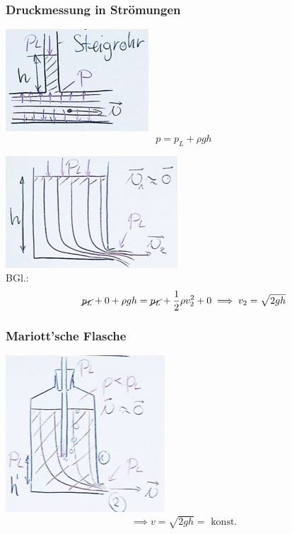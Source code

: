 \subsubsection{Druckmessung in Strömungen}
\includegraphics{Bild85}
\[ p = p_L + \rho g h \]
\begin{bsp*}[ note = Infusion ]
	\includegraphics{Bild86} \\
	BGl.:
	\[
		\cancel{p_L} + 0 + \rho g h = \cancel{p_L} + \frac{1}{2} \rho v_2^2 + 0 \\
		\implies v_2 = \sqrt{2gh}
	\]
\end{bsp*}

\subsubsection{Mariott'sche Flasche}
\includegraphics{Bild87}
\[ \implies v = \sqrt{2gh} = \text{ konst.} \]

